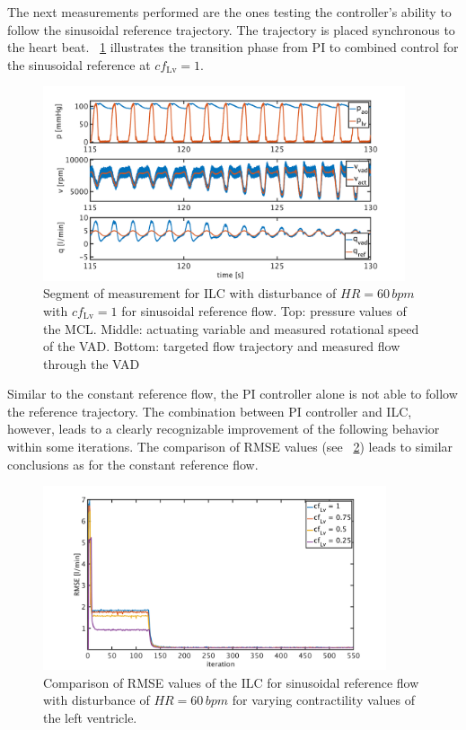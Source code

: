 The next measurements performed are the ones testing the controller's ability to follow the sinusoidal reference trajectory. The trajectory is placed synchronous to the heart beat. \figurename~\ref{fig:pi_to_ilc_dist_sine_cf1} illustrates the transition phase from PI to combined control for the sinusoidal reference at $cf_{\mathrm{Lv}}=1$.
\begin{figure}[ht!]
  \centering
  \includegraphics[width=0.95\textwidth]{images/chapt_5/ILC/pi_to_ilc_dist_sine_cf1.pdf}
  \caption[Segment of measurement for ILC with disturbance of $HR=60\,bpm$ with $cf_{\mathrm{Lv}}=1$ for sinusoidal reference flow]{Segment of measurement for ILC with disturbance of $HR=60\,bpm$ with $cf_{\mathrm{Lv}}=1$ for sinusoidal reference flow. Top:  pressure values of the MCL. Middle: actuating variable and measured rotational speed of the VAD. Bottom: targeted flow trajectory and measured flow through the VAD}
  \label{fig:pi_to_ilc_dist_sine_cf1}
\end{figure}
Similar to the constant reference flow, the PI controller alone is not able to follow the reference trajectory. The combination between PI controller and ILC, however, leads to a clearly recognizable improvement of the following behavior within some iterations.
The comparison of RMSE values (see \figurename~\ref{fig:RMSE_dist_sine_var_cf}) leads to similar conclusions as for the constant reference flow.
\begin{figure}[ht!]
  \centering
  \includegraphics[width=0.9\textwidth]{images/chapt_5/ILC/RMSE_dist_sine_var_cf.pdf}
  \caption[RMSE Comparison of ILC at sinusoidal reference flow for varying left ventricular contractilities]{Comparison of RMSE values of the ILC for sinusoidal reference flow with disturbance of $HR=60\,bpm$ for varying contractility values of the left ventricle.}
  \label{fig:RMSE_dist_sine_var_cf}
\end{figure}
